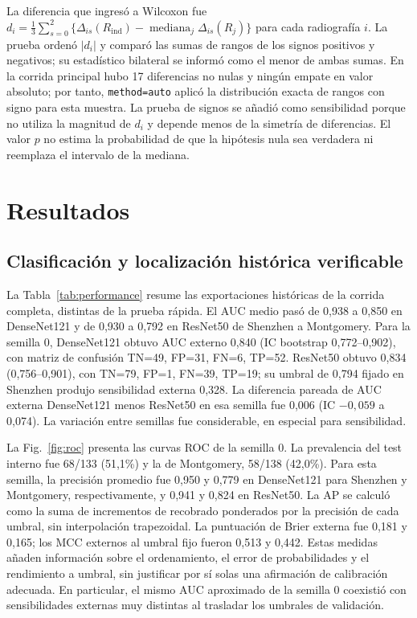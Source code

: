 \documentclass[conference]{IEEEtran}
\begin{document}
La diferencia que ingresó a Wilcoxon fue $d_i=\frac{1}{3}\sum_{s=0}^{2}\{\Delta_{is}(R_{\mathrm{ind}})-\operatorname{mediana}_j\Delta_{is}(R_j)\}$ para cada radiografía $i$. La prueba ordenó $|d_i|$ y comparó las sumas de rangos de los signos positivos y negativos; su estadístico bilateral se informó como el menor de ambas sumas. En la corrida principal hubo 17 diferencias no nulas y ningún empate en valor absoluto; por tanto, \texttt{method=auto} aplicó la distribución exacta de rangos con signo para esta muestra. La prueba de signos se añadió como sensibilidad porque no utiliza la magnitud de $d_i$ y depende menos de la simetría de diferencias. El valor $p$ no estima la probabilidad de que la hipótesis nula sea verdadera ni reemplaza el intervalo de la mediana.

\section{Resultados}
\subsection{Clasificación y localización histórica verificable}
La Tabla~\ref{tab:performance} resume las exportaciones históricas de la corrida completa, distintas de la prueba rápida. El AUC medio pasó de 0,938 a 0,850 en DenseNet121 y de 0,930 a 0,792 en ResNet50 de Shenzhen a Montgomery. Para la semilla 0, DenseNet121 obtuvo AUC externo 0,840 (IC bootstrap 0,772--0,902), con matriz de confusión TN=49, FP=31, FN=6, TP=52. ResNet50 obtuvo 0,834 (0,756--0,901), con TN=79, FP=1, FN=39, TP=19; su umbral de 0,794 fijado en Shenzhen produjo sensibilidad externa 0,328. La diferencia pareada de AUC externa DenseNet121 menos ResNet50 en esa semilla fue 0,006 (IC $-0,059$ a 0,074). La variación entre semillas fue considerable, en especial para sensibilidad.

La Fig.~\ref{fig:roc} presenta las curvas ROC de la semilla 0. La prevalencia del test interno fue 68/133 (51,1\%) y la de Montgomery, 58/138 (42,0\%). Para esta semilla, la precisión promedio fue 0,950 y 0,779 en DenseNet121 para Shenzhen y Montgomery, respectivamente, y 0,941 y 0,824 en ResNet50. La AP se calculó como la suma de incrementos de recobrado ponderados por la precisión de cada umbral, sin interpolación trapezoidal. La puntuación de Brier externa fue 0,181 y 0,165; los MCC externos al umbral fijo fueron 0,513 y 0,442. Estas medidas añaden información sobre el ordenamiento, el error de probabilidades y el rendimiento a umbral, sin justificar por sí solas una afirmación de calibración adecuada. En particular, el mismo AUC aproximado de la semilla 0 coexistió con sensibilidades externas muy distintas al trasladar los umbrales de validación.
\end{document}
